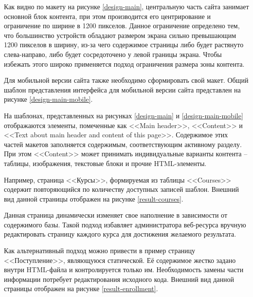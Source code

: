 
Как видно по макету на рисунке \ref{design-main}, центральную часть сайта занимает основной блок контента, при этом производится его центрирование и ограничение по ширине в 1200 пикселов. 
Данное ограничение определено тем, что большинство устройств обладают размером экрана сильно превышающим 1200 пикселов в ширину, из-за чего содержимое страницы либо будет растянуто слева-направо, либо будет сосредоточено у левой границы экрана.
Чтобы избежать этого широко применяется подход ограничения размера зоны контента.

Для мобильной версии сайта также необходимо сформировать свой макет.
Общий шаблон представления интерфейса для мобильной версии сайта представлен на рисунке \ref{design-main-mobile}.


На шаблонах, представленных на рисунках \ref{design-main} и \ref{design-main-mobile} отображаются элементы, помеченные как <<Main header>>, <<Content>> и <<Text about main header and content of this page>>.
Содержимое этих частей макетов заполняется содержимым, соответствующим активному разделу.
При этом <<Content>> может принимать индивидуальные варианты контента -- таблицы, изображения, текстовые блоки и прочие HTML-элементы.

Например, страница <<Курсы>>, формируемая из таблицы <<Courses>> содержит повторяющийся по количеству доступных записей шаблон.
Внешний вид данной страницы отображен на рисунке \ref{result-courses}.


Данная страница динамически изменяет свое наполнение в зависимости от содержимого базы.
Такой подход избавляет администратора веб-ресурса вручную редактировать страницу каждого курса для достижения желаемого результата.

Как альтернативный подход можно привести в пример страницу <<Поступление>>, являющуюся статической.
Её содержимое жестко задано внутри HTML-файла и контролируется только им.
Необходимость замены части информации потребует редактирования исходного кода.
Внешний вид данной страницы отображен на рисунке \ref{result-enrollment}.

